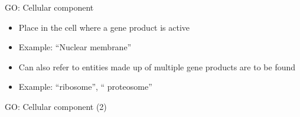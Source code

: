 \documentclass{beamer}
\begin{document}
\begin{frame}{GO: Cellular component}
\begin{itemize}
\item Place in the cell where a gene product is active
\item Example: \textquotedblleft Nuclear membrane\textquotedblright
\item Can also refer to entities made up of multiple gene products are to be found
\item Example: \textquotedblleft ribosome\textquotedblright, \textquotedblleft 
proteosome\textquotedblright
\end{itemize}
\end{frame}
\begin{frame}{GO: Cellular component (2)}
\begin{center}
\end{center}
\end{frame}
\end{document}
